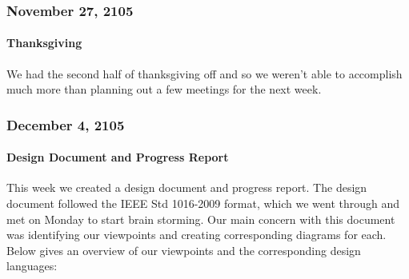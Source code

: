 \subsubsection{November 27, 2105}
\paragraph{Thanksgiving}
We had the second half of thanksgiving off and so we weren't able to accomplish much more than planning out a few meetings for the next week.\\

\subsubsection{December 4, 2105}
\paragraph{Design Document and Progress Report}
This week we created a design document and progress report. The design document followed the IEEE Std 1016-2009 format, which we went through and met on Monday to start brain storming. Our main concern with this document was identifying our viewpoints and creating corresponding diagrams for each. Below gives an overview of our viewpoints and the corresponding design languages:

